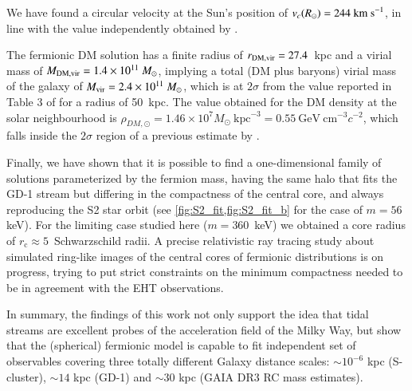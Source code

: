 \documentclass[twocolumn]{aa}
\begin{document}
We have found a circular velocity at the Sun's position of $v_c(R_\odot)= 244~\rm{km~s}^{-1}$, in line with the value independently obtained by \citet{2019MNRAS.486.2995M}.

The fermionic DM solution has a finite radius of $r_{\rm{DM,vir}}=27.4$~kpc and a virial mass of
$M_{\rm{DM,vir}}=1.4\times10^{11}~M_\odot$, implying a total (DM plus baryons) virial mass of the galaxy of $M_{\rm{vir}}= 2.4\times10^{11}~M_\odot$, which is at $2\sigma$ from the value reported in Table 3 of
\citet{2014MNRAS.445.3788G} for a radius of 50~kpc. The value obtained for the DM density at the solar neighbourhood is $\rho_{DM,\odot}=1.46\times10^7M_\odot~\mathrm{kpc}^{-3}=0.55~\mathrm{GeV}~\mathrm{cm}^{-3} c^{-2}$, which falls inside the $2\sigma$ region of a previous estimate by \citet{Salucci2010}.

Finally, we have shown that it is possible to find a one-dimensional family of solutions parameterized by the fermion mass, having the same halo that fits the GD-1 stream but differing in the compactness of the central core, and always reproducing the S2 star orbit (see \cref{fig:S2_fit,fig:S2_fit_b} for the case of $m=56$ keV). For the limiting case studied here ($m=360$~keV) we obtained a core radius of $r_\mathrm{c}\approx5$~Schwarzschild radii.
A precise relativistic ray tracing study about simulated ring-like images of the central
cores of fermionic distributions is on progress, trying to put strict constraints on the minimum
compactness needed to be in agreement with the EHT observations.

In summary, the findings of this work not only support the idea that tidal streams are excellent probes of the acceleration field of the Milky Way, but show that the (spherical) fermionic model is capable to fit independent set of observables covering three totally different Galaxy distance scales: $\sim 10^{-6}$ kpc (S-cluster), $\sim 14$ kpc (GD-1) and $\sim 30$ kpc (GAIA DR3 RC mass estimates).

\end{document}
